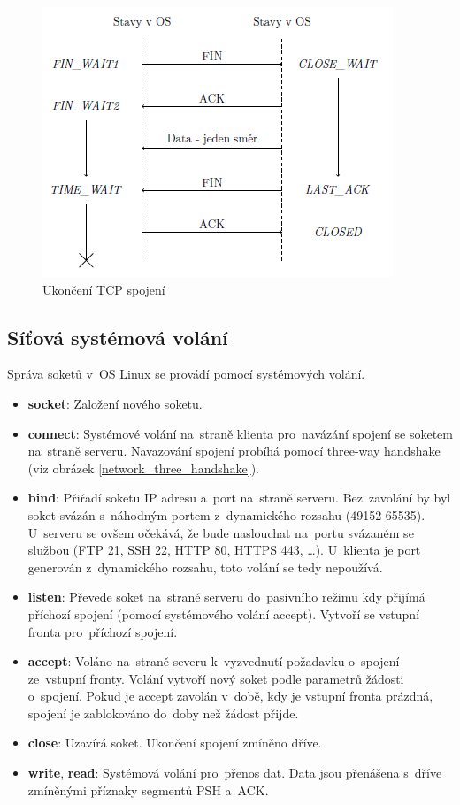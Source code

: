 \begin{figure}
	\centering
	\includegraphics[scale=1]{images/network_tcp_close.png}
	\caption{Ukončení TCP spojení}
	\label{network_tcp_close}
\end{figure}

\subsection{Síťová systémová volání}

Správa soketů v~OS Linux se provádí pomocí systémových volání.

\begin{itemize}
\item \textbf{socket}: Založení nového soketu.
\item \textbf{connect}: Systémové volání na~straně klienta pro~navázání spojení se soketem na~straně serveru. Navazování spojení probíhá pomocí three-way handshake (viz obrázek \ref{network_three_handshake}).
\item \textbf{bind}: Přiřadí soketu IP adresu a~port na~straně serveru. Bez~zavolání by byl soket svázán s~náhodným portem z~dynamického rozsahu (49152-65535). U~serveru se ovšem očekává, že bude naslouchat na~portu svázaném se službou (FTP 21, SSH 22, HTTP 80, HTTPS 443, \dots). U~klienta je port generován z~dynamického rozsahu, toto volání se tedy nepoužívá.
\item \textbf{listen}: Převede soket na~straně serveru do~pasivního režimu kdy přijímá příchozí spojení (pomocí systémového volání accept). Vytvoří se vstupní fronta pro~příchozí spojení.
\item \textbf{accept}: Voláno na~straně severu k~vyzvednutí požadavku o~spojení ze~vstupní fronty. Volání vytvoří nový soket podle parametrů žádosti o~spojení. Pokud je accept zavolán v~době, kdy je vstupní fronta prázdná, spojení je zablokováno do~doby než žádost přijde.
\item \textbf{close}: Uzavírá soket. Ukončení spojení zmíněno dříve.
\item \textbf{write}, \textbf{read}: Systémová volání pro~přenos dat. Data jsou přenášena s~dříve zmíněnými příznaky segmentů PSH a~ACK.
\end{itemize}


